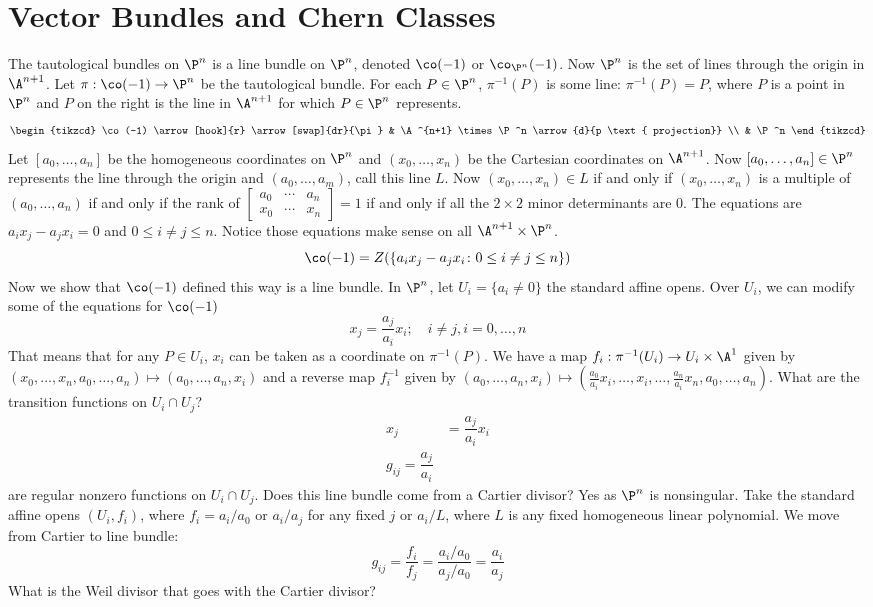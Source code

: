 \section{Vector Bundles and Chern Classes}


The tautological bundles on $\P^n$ is a line bundle on $\P^n$, denoted $\co(-1)$ or $\co_{\P^n}(-1)$. Now $\P^n$ is the set of lines through the origin in $\A^{n+1}$. Let $\pi: \co(-1) \to \P^n$ be the tautological bundle. For each $P \in \P^n$, $\pi^{-1}(P)$ is some line: $\pi^{-1}(P)=P$, where $P$ is a point in $\P^n$ and $P$ on the right is the line in $\A^{n+1}$ for which $P \in \P^n$ represents.
	\[
	\begin{tikzcd}
	\co(-1) \arrow[hook]{r} \arrow[swap]{dr}{\pi} & \A^{n+1} \times \P^n \arrow{d}{p \text{ projection}} \\
	& \P^n
	\end{tikzcd}
	\] 
Let $[a_0,\ldots,a_n]$ be the homogeneous coordinates on $\P^n$ and $(x_0,\ldots,x_n)$ be the Cartesian coordinates on $\A^{n+1}$. Now $[a_0,\ldots,a_n] \in \P^n$ represents the line through the origin and $(a_0,\ldots,a_m)$, call this line $L$. Now $(x_0,\ldots,x_n) \in L$ if and only if $(x_0,\ldots,x_n)$ is a multiple of $(a_0,\ldots,a_n)$ if and only if the rank of $\begin{bmatrix} a_0 & \cdots & a_n \\ x_0 & \cdots & x_n \end{bmatrix}=1$ if and only if all the $2 \times 2$ minor determinants are 0. The equations are $a_ix_j-a_jx_i=0$ and $0 \leq i \neq j \leq n$. Notice those equations make sense on all $\A^{n+1} \times \P^n$. 
	\[
	\co(-1)= Z(\{a_ix_j - a_j x_i \colon 0 \leq i\neq j \leq n\})
	\]
Now we show that $\co(-1)$ defined this way is a line bundle. In $\P^n$, let $U_i=\{a_i \neq 0\}$ the standard affine opens. Over $U_i$, we can modify some of the equations for $\co(-1)$
	\[
	x_j= \dfrac{a_j}{a_i} x_i; \quad i\neq j, i=0,\ldots,n
	\]
That means that for any $P \in U_i$, $x_i$ can be taken as a coordinate on $\pi^{-1}(P)$. We have a map $f_i: \pi^{-1}(U_i) \to U_i \times \A^1$ given by $(x_0,\ldots,x_n,a_0,\ldots,a_n) \mapsto (a_0,\ldots,a_n,x_i)$ and a reverse map $f^{-1}_i$ given by $(a_0,\ldots,a_n,x_i) \mapsto \left(\frac{a_0}{a_i} x_i,\ldots, x_i, \ldots, \frac{a_n}{a_i} x_n, a_0,\ldots,a_n\right)$. What are the transition functions on $U_i \cap U_j$? 
	\[
	\begin{split}
	x_j&= \dfrac{a_j}{a_i} x_i \\
	g_{ij}= \dfrac{a_j}{a_i}
	\end{split}
	\]
are regular nonzero functions on $U_i \cap U_j$. Does this line bundle come from a Cartier divisor? Yes as $\P^n$ is nonsingular. Take the standard affine opens $(U_i,f_i)$, where $f_i=a_i/a_0$ or $a_i/a_j$ for any fixed $j$ or $a_i/L$, where $L$ is any fixed homogeneous linear polynomial. We move from Cartier to line bundle:
	\[
	g_{ij}= \dfrac{f_i}{f_j}= \dfrac{a_i/a_0}{a_j/a_0} = \dfrac{a_i}{a_j}
	\]
What is the Weil divisor that goes with the Cartier divisor? 


